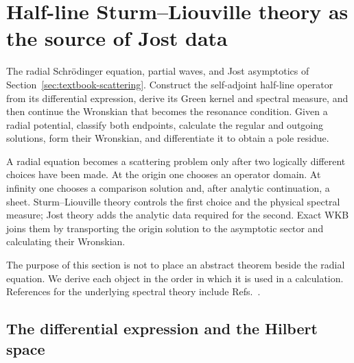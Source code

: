\section{Half-line Sturm--Liouville theory as the source of Jost data}
\label{sec:sturm-liouville-jost}

\calculationroute
  {The radial Schr\"odinger equation, partial waves, and Jost asymptotics of
  Section~\ref{sec:textbook-scattering}.}
  {Construct the self-adjoint half-line operator from its differential
  expression, derive its Green kernel and spectral measure, and then continue
  the Wronskian that becomes the resonance condition.}
  {Given a radial potential, classify both endpoints, calculate the regular
  and outgoing solutions, form their Wronskian, and differentiate it to
  obtain a pole residue.}

A radial equation becomes a scattering problem only after two logically
different choices have been made.  At the origin one chooses an operator
domain.  At infinity one chooses a comparison solution and, after analytic
continuation, a sheet.  Sturm--Liouville theory controls the first choice and
the physical spectral measure; Jost theory adds the analytic data required
for the second.  Exact WKB joins them by transporting the origin solution to
the asymptotic sector and calculating their Wronskian.

The purpose of this section is not to place an abstract theorem beside the
radial equation.  We derive each object in the order in which it is used in a
calculation.  References for the underlying spectral theory include
Refs.~\cite{Titchmarsh:1962,Zettl:2005,Rakityansky:2022Jost,
Kukulin:1989}.

\subsection{The differential expression and the Hilbert space}
\label{subsec:sl-expression-space}

